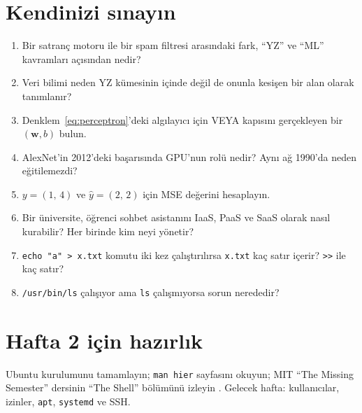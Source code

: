 \documentclass[11pt,a4paper]{article}
\begin{document}
\section{Kendinizi sınayın}
\begin{enumerate}
  \item Bir satranç motoru ile bir spam filtresi arasındaki fark, ``YZ'' ve ``ML'' kavramları açısından nedir?
  \item Veri bilimi neden YZ kümesinin içinde değil de onunla kesişen bir alan olarak tanımlanır?
  \item Denklem~\eqref{eq:perceptron}'deki algılayıcı için VEYA kapısını gerçekleyen bir $(\mathbf{w},b)$ bulun.
  \item AlexNet'in 2012'deki başarısında GPU'nun rolü nedir? Aynı ağ 1990'da neden eğitilemezdi?
  \item $y=(1,\,4)$ ve $\hat{y}=(2,\,2)$ için MSE değerini hesaplayın.
  \item Bir üniversite, öğrenci sohbet asistanını IaaS, PaaS ve SaaS olarak nasıl kurabilir? Her birinde kim neyi yönetir?
  \item \texttt{echo "a" > x.txt} komutu iki kez çalıştırılırsa \texttt{x.txt} kaç satır içerir? \texttt{>>} ile kaç satır?
  \item \texttt{/usr/bin/ls} çalışıyor ama \texttt{ls} çalışmıyorsa sorun nerededir?
\end{enumerate}

\section*{Hafta 2 için hazırlık}
Ubuntu kurulumunu tamamlayın; \texttt{man hier} sayfasını okuyun; MIT ``The Missing Semester'' dersinin ``The Shell'' bölümünü izleyin \cite{missing}. Gelecek hafta: kullanıcılar, izinler, \texttt{apt}, \texttt{systemd} ve SSH.
\end{document}
